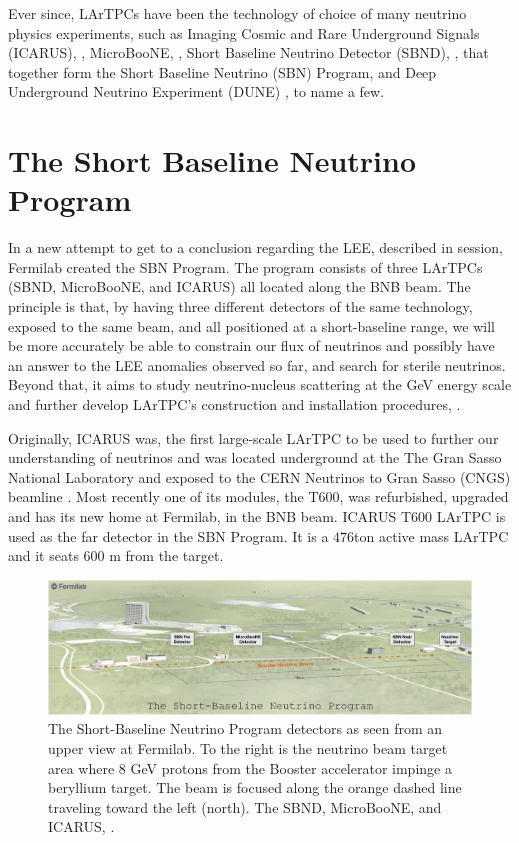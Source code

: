 Ever since, LArTPCs have been the technology of choice of many neutrino physics experiments, such as  Imaging Cosmic and Rare Underground Signals (ICARUS), \cite{ICARUS_proposal}, MicroBooNE, \cite{microboone_proposal}, Short Baseline Neutrino Detector (SBND), \cite{SBND}, that together form the Short Baseline Neutrino (SBN) Program, and Deep Underground Neutrino Experiment (DUNE) \cite{dune_snowmass_22}, to name a few. 

\section{The Short Baseline Neutrino Program}

In a new attempt to get to a conclusion regarding the LEE, described in session, Fermilab created the SBN Program. The program consists of three LArTPCs (SBND, MicroBooNE, and ICARUS) all located along the BNB beam. The principle is that, by having three different detectors of the same technology, exposed to the same beam, and all positioned at a short-baseline range, we will be more accurately be able to constrain our flux of neutrinos and possibly have an answer to the LEE anomalies observed so far, and search for sterile neutrinos. Beyond that, it aims to study neutrino-nucleus scattering at the GeV energy scale and further develop LArTPC's construction and installation procedures, \cite{SBN}.

Originally, ICARUS was, the first large-scale LArTPC to be used to further our understanding of neutrinos and was located underground at the The Gran Sasso National Laboratory and exposed to the CERN Neutrinos to Gran Sasso (CNGS) beamline \cite{ICARUS_proposal}. Most recently one of its modules, the T600, was refurbished, upgraded and has its new home at Fermilab, in the BNB beam. ICARUS T600 LArTPC is used as the far detector in the SBN Program. It is a $476$ton active mass LArTPC and it seats $600$ m from the target. 

\begin{figure}[h!]
	\begin{center}
		\includegraphics[scale=0.35]{Figures/SBN.png}
		\caption[SBN Program]{The Short-Baseline Neutrino Program detectors as seen from an upper view at Fermilab. To the right is the neutrino beam target area where 8 GeV protons from the Booster accelerator impinge a beryllium target. The beam is focused along the orange dashed line traveling toward the left (north). The SBND, MicroBooNE, and ICARUS, \cite{SBN}.
		}
		\label{sbn_program}
	\end{center}
\end{figure}

